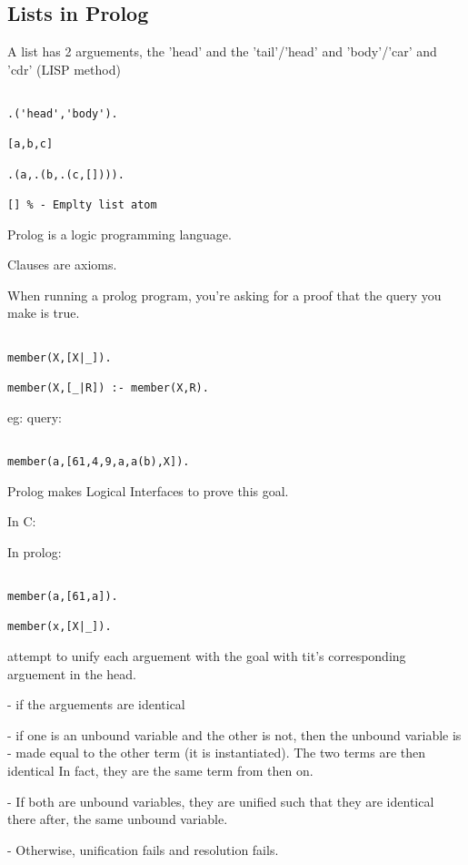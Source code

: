 \documentclass[a4paper,12pt]{article}
\begin{document}
\subsection{Lists in Prolog}

A list has 2 arguements, the 'head' and the 'tail'/'head' and 'body'/'car' and 'cdr' (LISP method) \\

\begin{verbatim}

.('head','body').

[a,b,c]

.(a,.(b,.(c,[]))).

[] % - Emplty list atom

\end{verbatim}

Prolog is a logic programming language.

Clauses are axioms.

When running a prolog program, you're asking for a proof that the query you make is true.

\begin{verbatim}

member(X,[X|_]).

member(X,[_|R]) :- member(X,R).

\end{verbatim}

eg: query:


\begin{verbatim}

member(a,[61,4,9,a,a(b),X]).

\end{verbatim}

Prolog makes Logical Interfaces to prove this goal.


In C:




In prolog:

\begin{verbatim}

member(a,[61,a]).
   
member(x,[X|_]).

\end{verbatim}

attempt to unify each arguement with the goal with tit's corresponding arguement in the head.

	- if the arguements are identical
	
	- if one is an unbound variable and the other is not, then the unbound variable is 
	- made equal to the other term (it is instantiated). The two terms are then identical
	  In fact, they are the same term from then on.

	- If both are unbound variables, they are unified such that they are identical there after,
	  the same unbound variable.

	- Otherwise, unification fails and resolution fails.
\end{document}
